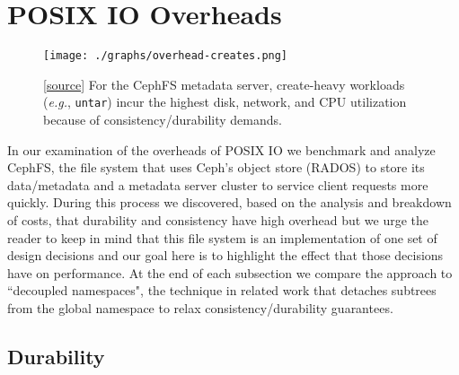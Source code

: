 \section{POSIX IO Overheads}
\label{sec:posix-overheads}

\begin{figure}[tb] \centering
\texttt{[image: ./graphs/overhead-creates.png]}
\caption{[\href{https://github.com/michaelsevilla/cudele-popper/blob/master/experiments/baseline-compile/visualize/viz.ipynb}{source}]
For the CephFS metadata server, create-heavy workloads ({\it e.g.},
\texttt{untar}) incur the highest disk, network, and CPU utilization because of
consistency/durability demands.}\label{fig:overhead-creates}
\end{figure}

In our examination of the overheads of POSIX IO we benchmark and analyze
CephFS, the file system that uses Ceph's object store (RADOS) to
store its data/metadata and a metadata server cluster to service client requests
more quickly.  During this process we discovered, based on the analysis and
breakdown of costs, that durability and consistency have high overhead but we
urge the reader to keep in mind that this file system is an implementation of
one set of design decisions and our goal here is to highlight the effect that
those decisions have on performance.  At the end of each subsection we compare
the approach to ``decoupled namespaces", the technique in related work that
detaches subtrees from the global namespace to relax consistency/durability
guarantees. 


\subsection{Durability}
\label{sec:durability}

